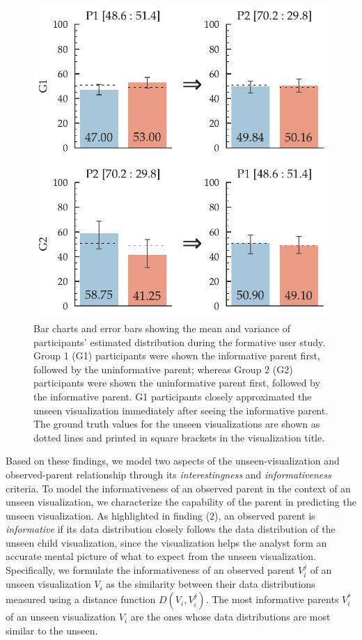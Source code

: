 \begin{figure}[h!]
\centering
\includegraphics[width=\linewidth]{figures/Formative_Study.pdf}
\caption{Bar charts and error bars showing the mean and variance of participants' estimated distribution during the formative user study. Group 1 (G1) participants were shown the informative parent first, followed by the uninformative parent; whereas Group 2 (G2) participants were shown the uninformative parent first, followed by the informative parent. G1 participants closely approximated the unseen visualization immediately after seeing the informative parent. The ground truth values for the unseen visualizations are shown as dotted lines and printed in square brackets in the visualization title.}
\label{fig:formative_study}
\end{figure}
\npar Based on these findings, we model two aspects of the unseen-visualization and observed-parent relationship through its \textit{interestingness} and \textit{informativeness} criteria.
 To model the informativeness of an observed parent in the context of an unseen visualization, we characterize the capability of the parent in predicting the unseen visualization. As highlighted in finding (2), an observed parent is \emph{informative} if its data distribution closely follows the data distribution of the unseen child visualization, since the visualization helps the analyst form an accurate mental picture of what to expect from the unseen visualization. Specifically, we formulate the informativeness of an observed parent $V_i^j$ of an unseen visualization $V_i$ as the similarity between their data distributions measured using a distance function $D(V_i, V_i^j)$. The most informative parents $V_i^*$ of an unseen visualization $V_i$ are the ones whose data distributions are most similar to the unseen.
